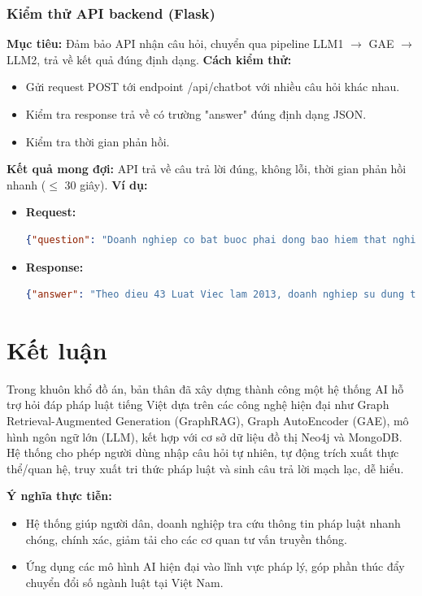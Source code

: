 \documentclass[a4paper]{article}
\begin{document}
\subsubsection{Kiểm thử API backend (Flask)}
\textbf{Mục tiêu:} Đảm bảo API nhận câu hỏi, chuyển qua pipeline LLM1 $\rightarrow$ GAE $\rightarrow$ LLM2, trả về kết quả đúng định dạng.
\textbf{Cách kiểm thử:}
\begin{itemize}
\item Gửi request POST tới endpoint /api/chatbot với nhiều câu hỏi khác nhau.
\item Kiểm tra response trả về có trường "answer" đúng định dạng JSON.
\item Kiểm tra thời gian phản hồi.
\end{itemize}
\textbf{Kết quả mong đợi:} API trả về câu trả lời đúng, không lỗi, thời gian phản hồi nhanh ($\leq$ 30 giây).
\textbf{Ví dụ:}
\begin{itemize}
\item \textbf{Request:}
\begin{lstlisting}[language=json]
{"question": "Doanh nghiep co bat buoc phai dong bao hiem that nghiep khong?"}
\end{lstlisting}
\item \textbf{Response:}
\begin{lstlisting}[language=json]
{"answer": "Theo dieu 43 Luat Viec lam 2013, doanh nghiep su dung tu 10 lao dong tro len bat buoc phai tham gia bao hiem that nghiep..."}
\end{lstlisting}
\end{itemize}
\newpage
\section{Kết luận}

Trong khuôn khổ đồ án, bản thân đã xây dựng thành công một hệ thống AI hỗ trợ hỏi đáp pháp luật tiếng Việt dựa trên các công nghệ hiện đại như Graph Retrieval-Augmented Generation (GraphRAG), Graph AutoEncoder (GAE), mô hình ngôn ngữ lớn (LLM), kết hợp với cơ sở dữ liệu đồ thị Neo4j và MongoDB. Hệ thống cho phép người dùng nhập câu hỏi tự nhiên, tự động trích xuất thực thể/quan hệ, truy xuất tri thức pháp luật và sinh câu trả lời mạch lạc, dễ hiểu.

\textbf{Ý nghĩa thực tiễn:}
\begin{itemize}
    \item Hệ thống giúp người dân, doanh nghiệp tra cứu thông tin pháp luật nhanh chóng, chính xác, giảm tải cho các cơ quan tư vấn truyền thống.
    \item Ứng dụng các mô hình AI hiện đại vào lĩnh vực pháp lý, góp phần thúc đẩy chuyển đổi số ngành luật tại Việt Nam.
\end{itemize}
\end{document}
